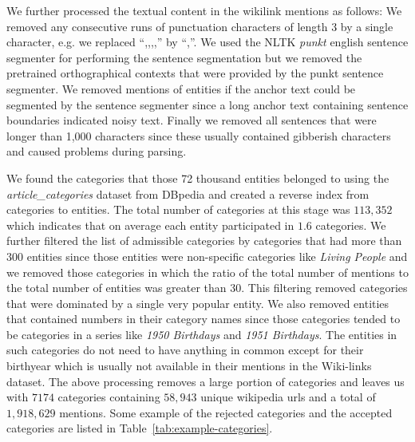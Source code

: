 \documentclass{article}
\newcommand{\tabref}[1]{Table~\ref{#1}}
\begin{document}
We further processed the textual content in the wikilink mentions as follows:
We removed any consecutive runs of punctuation characters of length 3 by a single character,
e.g. we replaced ``,,,,'' by ``,''. We used the NLTK \textit{punkt} english
sentence segmenter for performing the sentence segmentation but we removed the
pretrained orthographical contexts that were provided by the punkt sentence
segmenter. We removed mentions of entities if the anchor text could be segmented
by the sentence segmenter since a long anchor text containing sentence
boundaries indicated noisy text. Finally we removed all sentences that were
longer than 1,000 characters since these usually contained gibberish characters
and caused problems during parsing.

We found the categories that those 72 thousand entities belonged to using the
\textit{article\_categories} dataset from DBpedia and created a reverse index
from categories to entities. The total number of categories at this stage was
$113,352$ which indicates that on average each entity participated in $1.6$ categories.
We further filtered the list of admissible categories by categories that had more than
$300$ entities since those entities were non-specific categories like \textit{Living People}
and we removed those categories in which the ratio of the total number of mentions
to the total number of entities was greater than 30. This filtering removed categories
that were dominated by a single very popular entity. We also removed entities
that contained numbers in their category names since those categories tended to
be categories in a series like \textit{1950 Birthdays} and \textit{1951
Birthdays}. The entities in such categories do not need to have anything in
common except for their birthyear which is usually not available in their
mentions in the Wiki-links dataset.
The above processing removes a large portion of categories and leaves us with
$7174$ categories containing $58,943$ unique wikipedia urls and a total of $1,918,629$ mentions.
Some example of the rejected categories and the accepted categories are listed
in \tabref{tab:example-categories}.
\end{document}
